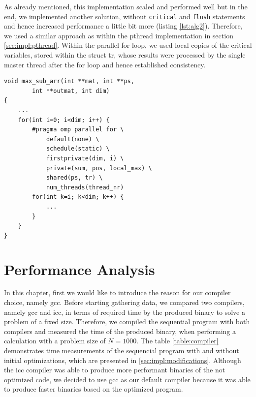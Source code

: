 \documentclass[conference]{IEEEtran}
\begin{document}
As already mentioned, this implementation scaled and performed well but in the end, we implemented another solution, without \texttt{critical} and \texttt{flush} statements and hence increased performance a little bit more (listing \ref{lst:alg2}). Therefore, we used a similar approach as within the pthread implementation in section \ref{sec:impl:pthread}. Within the parallel for loop, we used local copies of the critical variables, stored within the struct tr, whose results were processed by the single master thread after the for loop and hence established consistency. 


\begin{center}
   \begin{lstlisting}[captionpos=b, caption=OpenMP: Parallel Main Algorithm - Second Approach, label=lst:alg2]  
void max_sub_arr(int **mat, int **ps,                                                  
        int **outmat, int dim)                                                   
{                                                              
    ...                                        
    for(int i=0; i<dim; i++) {                                 
        #pragma omp parallel for \                             
            default(none) \                                    
            schedule(static) \                                 
            firstprivate(dim, i) \                             
            private(sum, pos, local_max) \                     
            shared(ps, tr) \                                   
            num_threads(thread_nr)                                                                                          
        for(int k=i; k<dim; k++) { 
            ...
        }
    }
}
   \end{lstlisting}
\end{center}



\section{Performance Analysis}
\label{sec:analysis}
In this chapter, first we would like to introduce the reason for our compiler choice, namely gcc. Before starting gathering data, we compared two compilers, namely gcc and icc, in terms of required time by the produced binary to solve a problem of a fixed size. Therefore, we compiled the sequential program with both compilers and measured the time of the produced binary, when performing a calculation with a problem size of $N=1000$. The table \ref{table:compiler} demonstrates time measurements of the sequencial program with and without initial optimizations, which are presented in \ref{sec:impl:modifications}. Although the icc compiler was able to produce more performant binaries of the not optimized code, we decided to use gcc as our default compiler because it was able to produce faster binaries based on the optimized program. 
\end{document}
